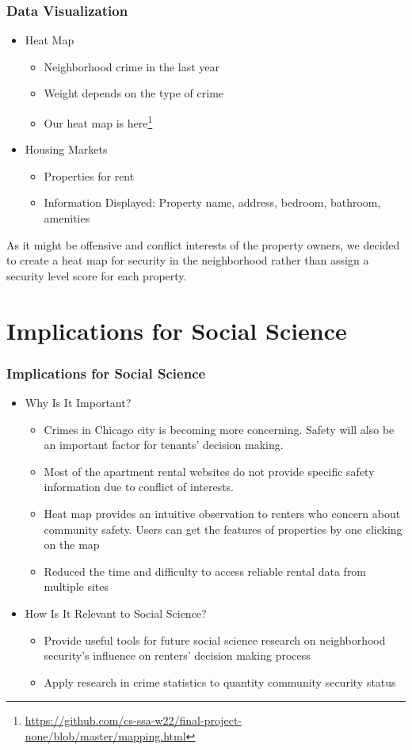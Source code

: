 \documentclass{beamer}
\begin{document}
\begin{frame}
	\frametitle{Data Visualization}
	\begin{itemize}
		\item Heat Map
		\begin{itemize}
		    \item Neighborhood crime in the last year
		    \item Weight depends on the type of crime
		    \item Our heat map is here\footnote{\url{https://github.com/cs-ssa-w22/final-project-none/blob/master/mapping.html}}
		\end{itemize}
		\item Housing Markets
		\begin{itemize}
		    \item Properties for rent
		    \item Information Displayed: Property name, address, bedroom, bathroom, amenities
		\end{itemize}
	\end{itemize}
	\vspace{0.8em}
	As it might be offensive and conflict interests of the property owners, we decided to create a heat map for security in the neighborhood rather than assign a security level score for each property.
\end{frame}




\section{Implications for Social Science}

\begin{frame}
	\frametitle{Implications for Social Science}
	\begin{itemize}
		\item Why Is It Important?
		\begin{itemize}
			\item Crimes in Chicago city is becoming more concerning. Safety will also be an important factor for tenants' decision making.
			\item Most of the apartment rental websites do not provide specific safety information due to conflict of interests.
			\item Heat map provides an intuitive observation to renters who concern about community safety. Users can get the features of properties by one clicking on the map
			\item Reduced the time and difficulty to access reliable rental data from multiple sites
		\end{itemize}
		\item How Is It Relevant to Social Science?
		\begin{itemize}
			\item Provide useful tools for future social science research on neighborhood security's influence on renters' decision making process
			\item Apply research in crime statistics to quantity community security status
		\end{itemize}
	\end{itemize}
\end{frame}
\end{document}
